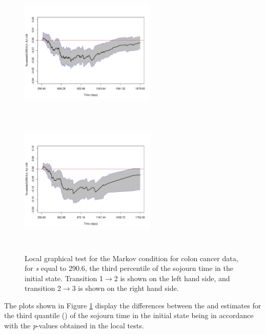\begin{figure} [t] %
\begin{center}
\includegraphics[width=6.5cm, height=6.5cm]{survIDM-images/perc3_p12_new3_final.pdf}
\includegraphics[width=6.5cm, height=6.5cm]{survIDM-images/perc3_p23_new3_final.pdf}\\
\caption{Local graphical test for the Markov condition for colon cancer data, for \textit{s} equal to 290.6, the third percentile of the sojourn time in the initial state. Transition 1$\rightarrow$2 is shown on the left hand side, and transition 2$\rightarrow$3 is shown on the right hand side.}
\label{fig8}
\end{center}
\end{figure}

The plots shown in Figure \ref{fig8} display the differences between the  and  estimates for the third quantile () of the sojourn time in the initial state being in accordance with the \textit{p}-values obtained in the local tests.


